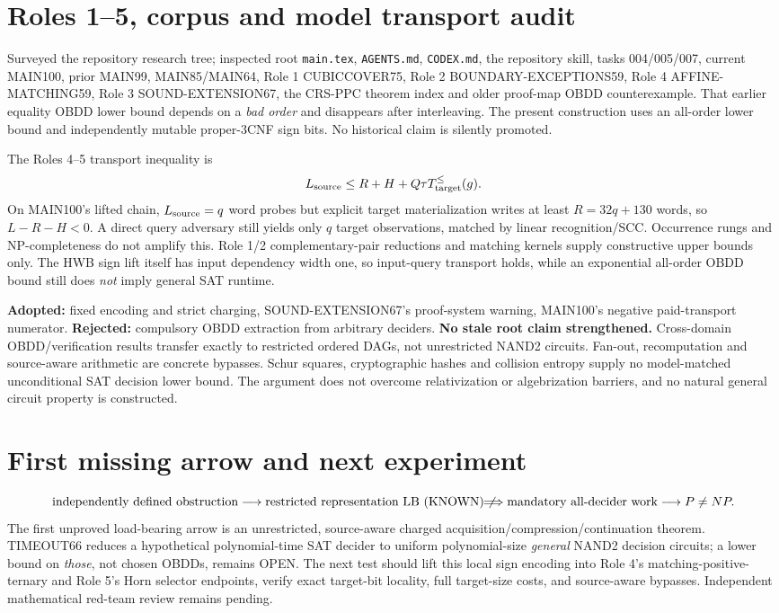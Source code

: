 \documentclass[11pt]{article}
\begin{document}
\section{Roles 1--5, corpus and model transport audit}
Surveyed the repository research tree; inspected root \texttt{main.tex}, \texttt{AGENTS.md}, \texttt{CODEX.md}, the repository skill, tasks 004/005/007, current MAIN100, prior MAIN99, MAIN85/MAIN64, Role 1 CUBICCOVER75, Role 2 BOUNDARY-EXCEPTIONS59, Role 4 AFFINE-MATCHING59, Role 3 SOUND-EXTENSION67, the CRS-PPC theorem index and older proof-map OBDD counterexample. That earlier equality OBDD lower bound depends on a \emph{bad order} and disappears after interleaving. The present construction uses an all-order lower bound and independently mutable proper-3CNF sign bits. No historical claim is silently promoted.

The Roles 4--5 transport inequality is
\[
L_{\rm source}\le R+H+Q\tau T_{\rm target}^{\le}(g).
\]
On MAIN100's lifted chain, $L_{\rm source}=q$ word probes but explicit target materialization writes at least $R=32q+130$ words, so $L-R-H<0$. A direct query adversary still yields only $q$ target observations, matched by linear recognition/SCC. Occurrence rungs and NP-completeness do not amplify this. Role 1/2 complementary-pair reductions and matching kernels supply constructive upper bounds only. The HWB sign lift itself has input dependency width one, so input-query transport holds, while an exponential all-order OBDD bound still does \emph{not} imply general SAT runtime.

\noindent\textbf{Adopted:} fixed encoding and strict charging, SOUND-EXTENSION67's proof-system warning, MAIN100's negative paid-transport numerator. \textbf{Rejected:} compulsory OBDD extraction from arbitrary deciders. \textbf{No stale root claim strengthened.}
Cross-domain OBDD/verification results transfer exactly to restricted ordered DAGs, not unrestricted NAND2 circuits. Fan-out, recomputation and source-aware arithmetic are concrete bypasses. Schur squares, cryptographic hashes and collision entropy supply no model-matched unconditional SAT decision lower bound. The argument does not overcome relativization or algebrization barriers, and no natural general circuit property is constructed.

\section{First missing arrow and next experiment}
\[
\text{independently defined obstruction}
\longrightarrow\text{restricted representation LB (KNOWN)}
\not\!\!\Longrightarrow\text{mandatory all-decider work}
\longrightarrow P\ne NP.
\]
The first unproved load-bearing arrow is an unrestricted, source-aware charged acquisition/compression/continuation theorem. TIMEOUT66 reduces a hypothetical polynomial-time SAT decider to uniform polynomial-size \emph{general} NAND2 decision circuits; a lower bound on \emph{those}, not chosen OBDDs, remains OPEN. The next test should lift this local sign encoding into Role 4's matching-positive-ternary and Role 5's Horn selector endpoints, verify exact target-bit locality, full target-size costs, and source-aware bypasses. Independent mathematical red-team review remains pending.
\end{document}

